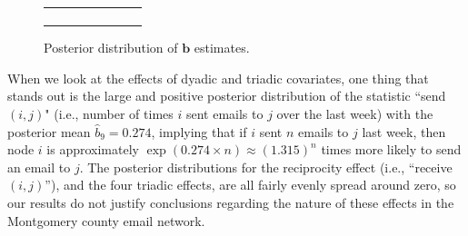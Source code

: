 \documentclass[ba]{imsart}
\numberwithin{equation}{section}
\theoremstyle{plain}
\begin{document}
\begin{figure}[!t]
\begin{tabular}[t]{cc}
\begin{subfigure}[b]{0.4975\textwidth}
						\label{subfigure:betaresults2}	
					\end{subfigure}
				\end{tabular}
				\caption {Posterior distribution of $\boldsymbol{b}$ estimates.}
				\label{figure:betaresults}
			\end{figure}
		
	When we look at the effects of dyadic and triadic covariates, one thing that stands out is the large and positive posterior distribution of the statistic ``send$(i,j)$" (i.e., number of times $i$ sent emails to $j$ over the last week) with the posterior mean $\hat{b}_9 = 0.274$, implying that if $i$ sent $n$ emails to $j$ last week, then node $i$ is approximately $\exp(0.274\times n)\approx(1.315)^n$ times more likely to send an email to $j$. The posterior distributions for the reciprocity effect (i.e., ``receive$(i, j)$''), and the four triadic effects, are all fairly evenly spread around zero, so our results do not justify conclusions regarding the nature of these effects in the Montgomery county email network.
\end{document}
